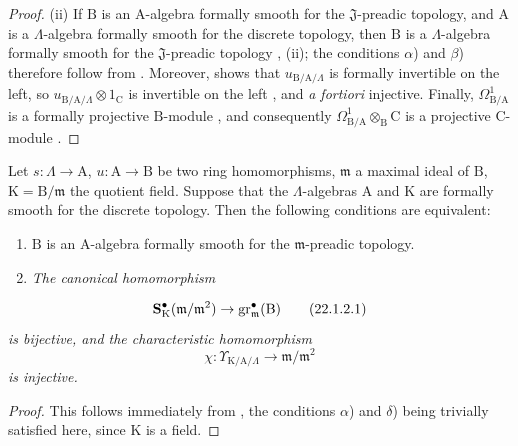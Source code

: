\begin{proof}
(ii) If $\mathrm{B}$ is an $\mathrm{A}$-algebra formally smooth for the $\mathfrak{J}$-preadic topology, and $\mathrm{A}$ is a $\Lambda$-algebra formally smooth for the discrete topology, then $\mathrm{B}$ is a $\Lambda$-algebra formally smooth for the $\mathfrak{J}$-preadic topology , (ii); the conditions $\alpha$) and $\beta$) therefore follow from . Moreover,  shows that $u_{\mathrm{B}/\mathrm{A}/\Lambda}$ is formally invertible on the left, so $u_{\mathrm{B}/\mathrm{A}/\Lambda}\otimes 1_\mathrm{C}$ is invertible on the left , and \emph{a fortiori} injective. Finally, $\Omega^1_{\mathrm{B}/\mathrm{A}}$ is a formally projective $\mathrm{B}$-module , and consequently $\Omega^1_{\mathrm{B}/\mathrm{A}}\otimes_\mathrm{B}\mathrm{C}$ is a projective $\mathrm{C}$-module .
\end{proof}

\begin{corollary}[22.1.2]
\label{0.22.1.2}
Let $s:\Lambda\to\mathrm{A}$, $u:\mathrm{A}\to\mathrm{B}$ be two ring homomorphisms, $\mathfrak{m}$ a maximal ideal of $\mathrm{B}$, $\mathrm{K}=\mathrm{B}/\mathfrak{m}$ the quotient field.
Suppose that the $\Lambda$-algebras $\mathrm{A}$ and $\mathrm{K}$ are formally smooth for the discrete topology.
Then the following conditions are equivalent:
\begin{enumerate}
  \item[\textup{a)}] $\mathrm{B}$ is an $\mathrm{A}$-algebra formally smooth for the $\mathfrak{m}$-preadic topology.
  \item[\textup{b)}] \emph{The canonical homomorphism}
\end{enumerate}
\[
\label{0.22.1.2.1}
  \mathbf{S}^\bullet_\mathrm{K}(\mathfrak{m}/\mathfrak{m}^2)\to\operatorname{gr}^\bullet_\mathfrak{m}(\mathrm{B})
  \tag{22.1.2.1}
\]
\emph{is bijective, and the characteristic homomorphism}
\[
\label{0.22.1.2.2}
  \chi:\Upsilon_{\mathrm{K}/\mathrm{A}/\Lambda}\to\mathfrak{m}/\mathfrak{m}^2
  \tag{22.1.2.2}
\]
\emph{is injective.}
\end{corollary}

\begin{proof}
This follows immediately from , the conditions $\alpha$) and $\delta$) being trivially satisfied here, since $\mathrm{K}$ is a field.
\end{proof}

